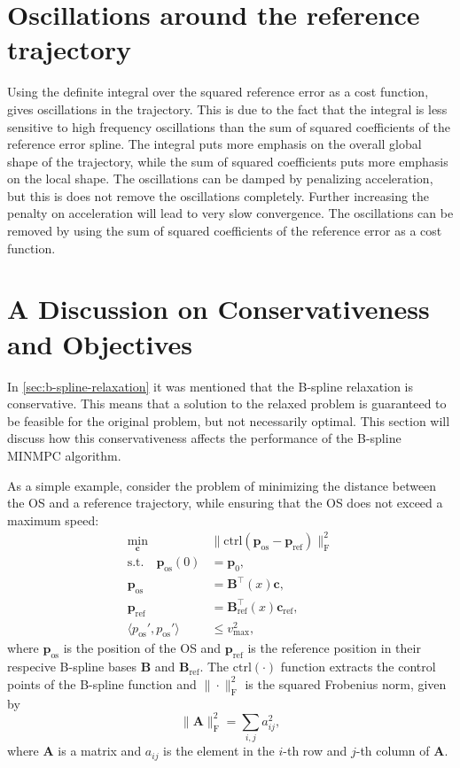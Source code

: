 \section{Oscillations around the reference trajectory}
\label{sec:oscillations}
Using the definite integral over the squared reference error as a cost function, gives oscillations in the trajectory. This is due to the fact that the integral is less sensitive to high frequency oscillations than the sum of squared coefficients of the reference error spline. The integral puts more emphasis on the overall global shape of the trajectory, while the sum of squared coefficients puts more emphasis on the local shape. The oscillations can be damped by penalizing acceleration, but this is does not remove the oscillations completely. Further increasing the penalty on acceleration will lead to very slow convergence.
The oscillations can be removed by using the sum of squared coefficients of the reference error as a cost function.

\section{A Discussion on Conservativeness and Objectives}
\label{sec:conservativeness}
In \cref{sec:b-spline-relaxation} it was mentioned that the B-spline relaxation is conservative. This means that a solution to the relaxed problem is guaranteed to be feasible for the original problem, but not necessarily optimal. This section will discuss how this conservativeness affects the performance of the B-spline MINMPC algorithm.

As a simple example, consider the problem of minimizing the distance between the OS and a reference trajectory, while ensuring that the OS does not exceed a maximum speed:
\begin{equation}
    \begin{aligned}
        \min_{\mathbf c} \quad & \|\text{ctrl}(\mathbf p_\text{os} - \mathbf p_\text{ref})\|_\text{F}^2 \\
        \text{s.t.} \quad \mathbf p_\text{os}(0) &= \mathbf p_0, \\
                     \mathbf p_\text{os} &= \mathbf B^\top(x) \mathbf c, \\
                     \mathbf p_\text{ref} &= \mathbf B_\text{ref}^\top(x) \mathbf c_\text{ref}, \\
                     \langle p_\text{os}', p_\text{os}' \rangle &\le v_\text{max}^2,
    \end{aligned}
\end{equation}
where $\mathbf p_\text{os}$ is the position of the OS and $\mathbf p_\text{ref}$ is the reference position in their respecive B-spline bases $\mathbf B$ and $\mathbf B_\text{ref}$. The $\text{ctrl}(\cdot)$ function extracts the control points of the B-spline function and $\|\cdot\|_\text{F}^2$ is the squared Frobenius norm, given by
\begin{equation}
    \|\mathbf A\|_\text{F}^2 = \sum_{i,j} a_{ij}^2,
\end{equation}
where $\mathbf A$ is a matrix and $a_{ij}$ is the element in the $i$-th row and $j$-th column of $\mathbf A$. 
 
